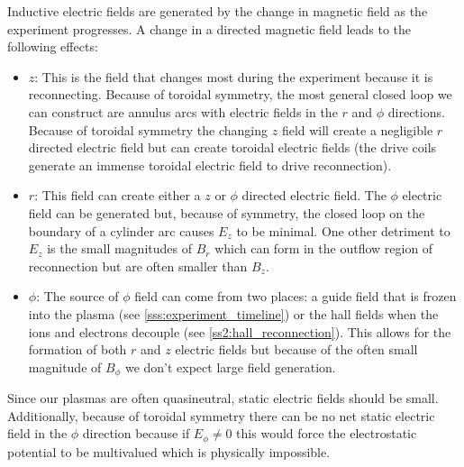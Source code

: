 

Inductive electric fields are generated by the change in magnetic field as the experiment progresses. A change in a directed magnetic field leads to the following effects:
\begin{itemize}
    \item $z$: This is the field that changes most during the experiment because it is reconnecting. Because of toroidal symmetry, the most general closed loop we can construct are annulus arcs with electric fields in the $r$ and $\phi$ directions. Because of toroidal symmetry the changing $z$ field will create a negligible $r$ directed electric field but can create toroidal electric fields (the drive coils generate an immense toroidal electric field to drive reconnection).
    \item $r$: This field can create either a $z$ or $\phi$ directed electric field. The $\phi$ electric field can be generated but, because of symmetry, the closed loop on the boundary of a cylinder arc causes $E_z$ to be minimal. One other detriment to $E_z$ is the small magnitudes of $B_r$ which can form in the outflow region of reconnection but are often smaller than $B_z$.
    \item $\phi$: The source of $\phi$ field can come from two places: a guide field that is frozen into the plasma (see \ref{sss:experiment_timeline}) or the hall fields when the ions and electrons decouple (see \ref{ss2:hall_reconnection}). This allows for the formation of both $r$ and $z$ electric fields but because of the often small magnitude of $B_\phi$ we don't expect large field generation.
\end{itemize}

Since our plasmas are often quasineutral, static electric fields should be small. Additionally, because of toroidal symmetry there can be no net static electric field in the $\phi$ direction because if $E_\phi \neq 0$ this would force the electrostatic potential to be multivalued which is physically impossible.

